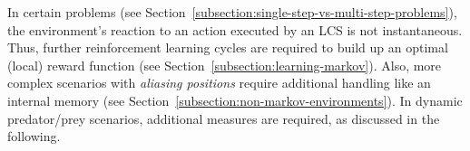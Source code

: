 


In certain problems (see Section~\ref{subsection:single-step-vs-multi-step-problems}), the environment's reaction to an action executed by an LCS is not instantaneous. Thus, further reinforcement learning cycles are required to build up an optimal (local) reward function (see Section~\ref{subsection:learning-markov}). Also, more complex scenarios with \emph{aliasing positions} require additional handling like an internal memory (see Section~\ref{subsection:non-markov-environments}). In dynamic predator/prey scenarios, additional measures are required, as discussed in the following.


